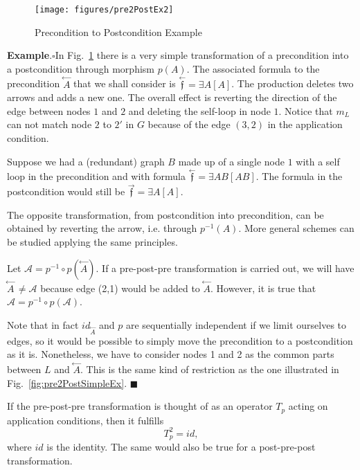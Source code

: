 \documentclass{fundam}
\newcommand{\proofend}{\hfill$\blacksquare$}
\begin{document}
\begin{figure}[htbp]
  \centering
  \texttt{[image: figures/pre2PostEx2]}
  \caption{Precondition to Postcondition Example}
  \label{fig:pre2PostEx}
\end{figure}

\noindent\textbf{Example}.$\square$In Fig.~\ref{fig:pre2PostEx} there
is a very simple transformation of a precondition into a postcondition
through morphism $p(A)$. The associated formula to the precondition
$\stackrel{\leftarrow}{A}$ that we shall consider is
$\stackrel{\leftarrow}{\mathfrak{f}} = \exists A [A]$. The production
deletes two arrows and adds a new one. The overall effect is reverting
the direction of the edge between nodes $1$ and $2$ and deleting the
self-loop in node $1$. Notice that $m_L$ can not match node $2$ to
$2'$ in $G$ because of the edge $(3,2)$ in the application condition.

Suppose we had a (redundant) graph $B$ made up of a single node $1$
with a self loop in the precondition and with formula
$\stackrel{\leftarrow}{\mathfrak{f}} = \exists AB [AB]$. The formula
in the postcondition would still be
$\stackrel{\rightarrow}{\mathfrak{f}} = \exists A [A]$.

The opposite transformation, from postcondition into precondition, can
be obtained by reverting the arrow, i.e. through $p^{-1}(A)$.  More
general schemes can be studied applying the same principles.

Let $\mathcal{A} = p^{-1} \circ p \left( \stackrel{\leftarrow}{A}
\right)$. If a pre-post-pre transformation is carried out, we will
have $\stackrel{\leftarrow}{A} \,\neq \mathcal{A}$ because edge (2,1)
would be added to $\stackrel{\leftarrow}{A}$. However, it is true that
$\mathcal{A} = p^{-1}\circ p \left( \mathcal{A} \right)$.

Note that in fact $id_{\stackrel{\leftarrow}{A}}$ and $p$ are
sequentially independent if we limit ourselves to edges, so it would
be possible to simply move the precondition to a postcondition as it
is. Nonetheless, we have to consider nodes 1 and 2 as the common parts
between $L$ and $\stackrel{\leftarrow}{A}$. This is the same kind of
restriction as the one illustrated in
Fig.~\ref{fig:pre2PostSimpleEx}. \proofend

If the pre-post-pre transformation is thought of as an operator $T_p$
acting on application conditions, then it fulfills
\begin{equation}
  \label{eq:2}
  T_p^2 = id,
\end{equation}
where $id$ is the identity. The same would also be true for a
post-pre-post transformation.
\end{document}
